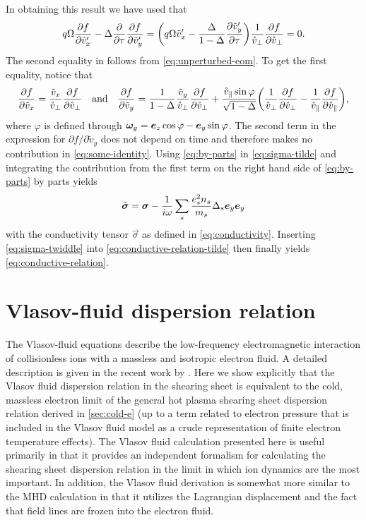 \documentclass[aps,pre,notitlepage,amsmath,amssymb,amsfonts,nobibnotes,nofootinbib,superscriptaddress]{revtex4-1}
\begin{document}
In obtaining this result we have used that
\begin{equation}
  \label{eq:some-identity}
  q\Omega\pder{f}{\tilde{v}_x'}
  - \Delta\pder{}{\tau}\pder{f}{\tilde{v}_y'}
  = \left(
    q\Omega\tilde{v}_x' - \frac{\Delta}{1-\Delta}\pder{\tilde{v}_y'}{\tau}
  \right)
  \frac{1}{\vc_\perp}\pder{f}{\vc_\perp} = 0.
\end{equation}
The second equality in follows from \cref{eq:unperturbed-eom}. To get the
first equality, notice that
\begin{equation}
  \pder{f}{\tilde{v}_x} = \frac{\tilde{v}_x}{\vc_\perp}\pder{f}{\vc_\perp}
  \quad\textrm{and}\quad
  \pder{f}{\tilde{v}_y} =
  \frac{1}{1-\Delta}\frac{\tilde{v}_y}{\vc_\perp}\pder{f}{\vc_\perp}
  + \frac{\vc_\parallel\sin\varphi}{\sqrt{1-\Delta}}\left(
    \frac{1}{\vc_\perp}\pder{f}{\vc_\perp}
    - \frac{1}{\vc_\parallel}\pder{f}{\vc_\parallel}
  \right),
\end{equation}
where $\varphi$ is defined through $\bm{\omega}_g=\bm{e}_z\cos\varphi-\bm{e}_y\sin\varphi$. The
second term in the expression for $\partial{}f/\partial\tilde{v}_y$ does not
depend on time and therefore makes no contribution in \cref{eq:some-identity}.
Using \cref{eq:by-parts} in \cref{eq:sigma-tilde} and integrating the
contribution from the first term on the right hand side of \cref{eq:by-parts}
by parts yields
\begin{equation}
  \label{eq:sigma-twiddle}
  \tvec{\sigma} = \vec{\sigma}
  - \frac{1}{i\omega}\sums\frac{\qs^2n_s}{m_s}\Delta_s\ey\ey
\end{equation}
with the conductivity tensor $\vec{\sigma}$ as defined in
\cref{eq:conductivity}. Inserting \cref{eq:sigma-twiddle} into
\cref{eq:conductive-relation-tilde} then finally yields
\cref{eq:conductive-relation}.

\section{Vlasov-fluid dispersion relation}
\label{app:vlasov-fluid}

The Vlasov-fluid equations \citep{Freidberg1972} describe the low-frequency
electromagnetic interaction of collisionless ions with a massless and
isotropic electron fluid. A detailed description is given in the recent work
by \citet{Cerfon2011}. Here we show explicitly that the Vlasov fluid
dispersion relation in the shearing sheet is equivalent to the cold, massless
electron limit of the general hot plasma shearing sheet dispersion relation
derived in \cref{sec:cold-e} (up to a term related to electron pressure that
is included in the Vlasov fluid model as a crude representation of finite
electron temperature effects). The Vlasov fluid calculation presented here is
useful primarily in that it provides an independent formalism for calculating
the shearing sheet dispersion relation in the limit in which ion dynamics are
the most important. In addition, the Vlasov fluid derivation is somewhat more
similar to the MHD calculation in that it utilizes the Lagrangian displacement
and the fact that field lines are frozen into the electron fluid.
\end{document}
